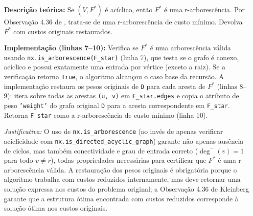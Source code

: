 \begin{tcolorbox}[
        enhanced, breakable,
        colframe=green!60!black, colback=green!5,
        colbacktitle=green!20, coltitle=black,
        title={Passo 3: Verificação de aciclicidade (caso base)},
        boxed title style={sharp corners, boxrule=0.6pt},
        sharp corners, boxrule=0.6pt
    ]
    \textbf{Descrição teórica:} Se \((V,F^*)\) é acíclico, então \(F^*\) é uma r-arborescência. Por Observação 4.36 de \cite{kleinberg2006}, trata-se de uma r-arborescência de custo mínimo. Devolva \(F^*\) com custos originais restaurados.

    \tcblower

    \textbf{Implementação (linhas 7--10):} Verifica se \(F^*\) é uma arborescência válida usando \texttt{nx.is\_arborescence(F\_star)} (linha 7), que testa se o grafo é conexo, acíclico e possui exatamente uma entrada por vértice (exceto a raiz). Se a verificação retorna \texttt{True}, o algoritmo alcançou o caso base da recursão. A implementação restaura os pesos originais de \texttt{D} para cada aresta de \(F^*\) (linhas 8--9): itera sobre todas as arestas \texttt{(u, v)} em \texttt{F\_star.edges} e copia o atributo de peso \texttt{'weight'} do grafo original \texttt{D} para a aresta correspondente em \texttt{F\_star}. Retorna \texttt{F\_star} como a r-arborescência de custo mínimo (linha 10).

    \emph{Justificativa:} O uso de \texttt{nx.is\_arborescence} (ao invés de apenas verificar aciclicidade com \texttt{nx.is\_directed\_acyclic\_graph}) garante não apenas ausência de ciclos, mas também conectividade e grau de entrada correto (\(\deg^-(v)=1\) para todo \(v\neq r\)), todas propriedades necessárias para certificar que \(F^*\) é uma r-arborescência válida. A restauração dos pesos originais é obrigatória porque o algoritmo trabalha com custos reduzidos internamente, mas deve retornar uma solução expressa nos custos do problema original; a Observação 4.36 de Kleinberg garante que a estrutura ótima encontrada com custos reduzidos corresponde à solução ótima nos custos originais.
\end{tcolorbox}

